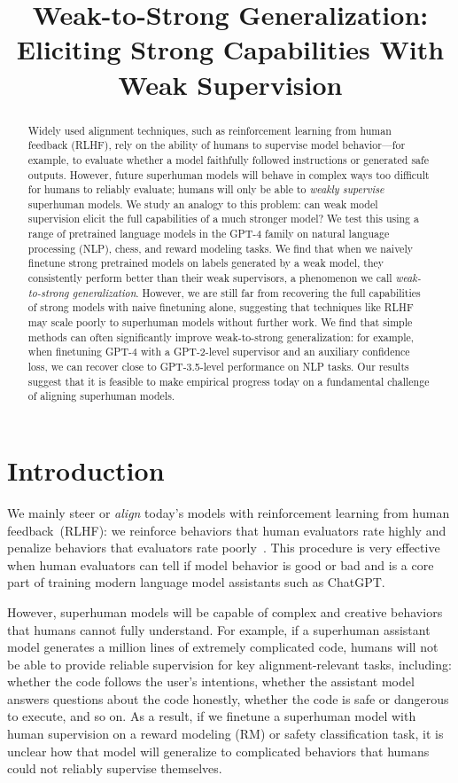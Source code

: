 \title{Weak-to-Strong Generalization: Eliciting Strong Capabilities With Weak Supervision}

\begin{abstract}
Widely used alignment techniques, such as reinforcement learning from human feedback (RLHF), rely on the ability of humans to supervise model behavior---for example, to evaluate whether a model faithfully followed instructions or generated safe outputs. However, future superhuman models will behave in complex ways too difficult for humans to reliably evaluate; humans will only be able to \textit{weakly supervise} superhuman models. We study an analogy to this problem: can weak model supervision elicit the full capabilities of a much stronger model? We test this using a range of pretrained language models in the GPT-4 family on natural language processing (NLP), chess, and reward modeling tasks. We find that when we naively finetune strong pretrained models on labels generated by a weak model, they consistently perform better than their weak supervisors, a phenomenon we call \textit{weak-to-strong generalization}. However, we are still far from recovering the full capabilities of strong models with naive finetuning alone, suggesting that techniques like RLHF may scale poorly to superhuman models without further work. We find that simple methods can often significantly improve weak-to-strong generalization: for example, when finetuning GPT-4 with a GPT-2-level supervisor and an auxiliary confidence loss, we can recover close to GPT-3.5-level performance on NLP tasks. Our results suggest that it is feasible to make empirical progress today on a fundamental challenge of aligning superhuman models.
\end{abstract}

\section{Introduction}

We mainly steer or \textit{align} today's models with reinforcement learning from human feedback~(RLHF): we reinforce behaviors that human evaluators rate highly and penalize behaviors that evaluators rate poorly~\citep{christiano2017deep,stiennon2020learning,ouyang2022training,glaese2022improving,bai2022training}. This procedure is very effective when human evaluators can tell if model behavior is good or bad and is a core part of training modern language model assistants such as ChatGPT. 

However, superhuman models will be capable of complex and creative behaviors that humans cannot fully understand. For example, if a superhuman assistant model generates a million lines of extremely complicated code, humans will not be able to provide reliable supervision for key alignment-relevant tasks, including: whether the code follows the user's intentions, whether the assistant model answers questions about the code honestly, whether the code is safe or dangerous to execute, and so on. As a result, if we finetune a superhuman model with human supervision on a reward modeling (RM) or safety classification task, it is unclear how that model will generalize to complicated behaviors that humans could not reliably supervise themselves.

